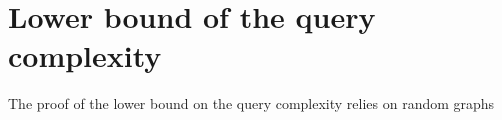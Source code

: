 \section{Lower bound of the query complexity}
The proof of the lower bound on the query complexity relies on random graphs

